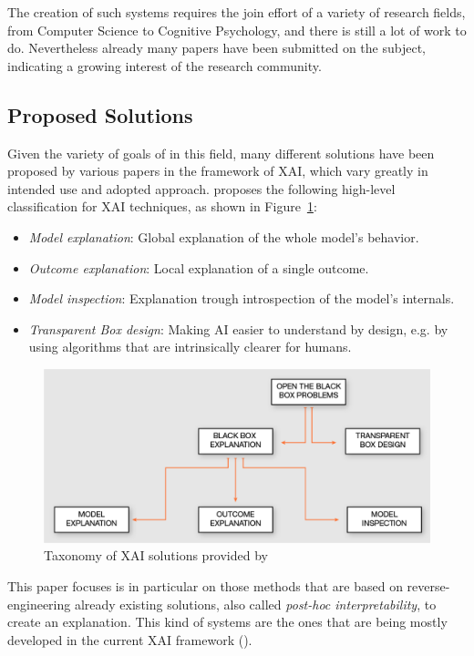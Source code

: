 \documentclass[conference]{IEEEtran}
\begin{document}
The creation of such systems requires the join effort of a variety of research
fields, from Computer Science to Cognitive Psychology, and there is still a lot
of work to do. Nevertheless already many papers have been submitted on the
subject, indicating a growing interest of the research community.

\subsection{Proposed Solutions}
\label{sec:solutions}

Given the variety of goals of in this field, many different solutions
have been proposed by various papers in the framework of XAI, which vary greatly
in intended use and adopted approach. \citet{Giannotti} proposes the following high-level classification for XAI techniques, as shown in Figure~\ref{fig:xaiclass}:

\begin{itemize}
    \item \textit{Model explanation}: Global explanation of the whole model's behavior.
    \item \textit{Outcome explanation}: Local explanation of a single outcome.
    \item \textit{Model inspection}: Explanation trough introspection of the model's internals.
    \item \textit{Transparent Box design}: Making AI easier to understand by design, e.g. by using algorithms that are intrinsically clearer for humans.
\end{itemize}

\begin{figure}[h!] \includegraphics[width=\linewidth]{images/xaiclass.png}
    \caption{Taxonomy of XAI solutions provided by \citet{Giannotti}} \label{fig:xaiclass} \end{figure}

This paper focuses is in particular on those methods that are based on
reverse-engineering already existing solutions, also called \textit{post-hoc
    interpretability}, to create an explanation. This kind of systems are the ones
that are being mostly developed in the current XAI framework
(\citet{Giannotti}).
\end{document}
